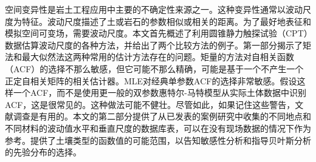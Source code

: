 \documentclass{bilidoc}
\begin{document}
\begin{ParaColumn}[][0.62\textwidth]
    空间变异性是岩土工程应用中主要的不确定性来源之一。这种变异性通常以波动尺度为特征。波动尺度描述了土或岩石的参数相似或相关的距离。为了最好地表征和模拟空间可变场，需要波动尺度。本文首先概述了利用圆锥静力触探试验（CPT）数据估算波动尺度的各种方法，并给出了两个比较方法的例子。第一部分揭示了矩法和最大似然法这两种常用的估计方法存在的问题。矩量的方法对自相关函数（ACF）的选择不那么敏感，但它可能不那么精确，可能是基于一个不产生一个正定自相关矩阵的相关估计器。MLE对经典单参数ACF的选择非常敏感。假设这样一个ACF，而不是使用更一般的双参数惠特尔-马特模型从实际土体数据中识别ACF，这是很常见的。这种做法可能不健壮。尽管如此，如果记住这些警告，文献调查是有用的。本文的第二部分提供了从已发表的案例研究中收集的不同地点和不同材料的波动值水平和垂直尺度的数据库表，可以在没有现场数据的情况下作为参考。提供了土壤类型的函数值的可能范围，以告知敏感性分析和指导贝叶斯分析的先验分布的选择。

\end{ParaColumn}





    
\end{document}
